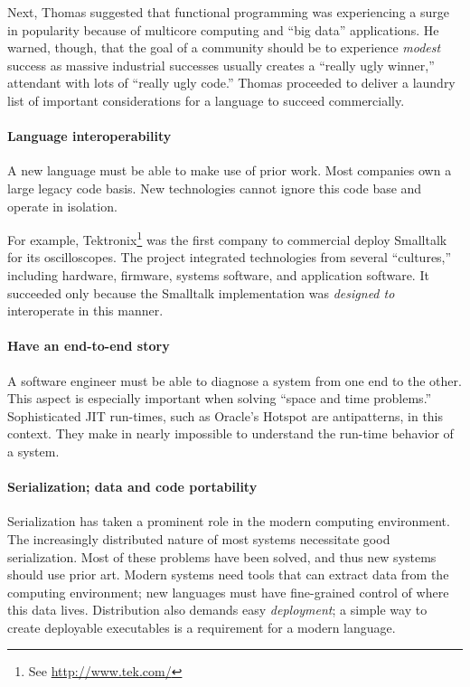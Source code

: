 \documentclass{jfp1}
\begin{document}
Next, Thomas suggested that functional programming was experiencing a surge
in popularity because of multicore computing and ``big data''
applications. He warned, though, that the goal of a community should be to
experience \textit{modest} success as massive industrial successes usually
creates a ``really ugly winner,'' attendant with lots of ``really ugly
code.'' Thomas proceeded to deliver a laundry list of important
considerations for a language to succeed commercially.

\paragraph{Language interoperability} A new language must be able to make
use of prior work. Most companies own a large legacy code basis. New
technologies cannot ignore this code base and operate in isolation.  

For example, Tektronix\footnote{See \url{http://www.tek.com/}} was the
first company to commercial deploy Smalltalk for its oscilloscopes. The
project integrated technologies from several ``cultures,'' including
hardware, firmware, systems software, and application software. It
succeeded only because the Smalltalk implementation was {\em designed to\/}
interoperate in this manner.

\paragraph{Have an end-to-end story} A software engineer must be able to
diagnose a system from one end to the other. This aspect is especially
important when solving ``space and time problems.'' Sophisticated JIT
run-times, such as Oracle's Hotspot are antipatterns, in this context. They
make in nearly impossible to understand the run-time behavior of a system.

\paragraph{Serialization; data and code portability} Serialization has
taken a prominent role in the modern computing environment. The
increasingly distributed nature of most systems necessitate good
serialization.  Most of these problems have been solved, and thus new
systems should use prior art. Modern systems need tools that can extract
data from the computing environment; new languages must have fine-grained
control of where this data lives. Distribution also demands easy
\textit{deployment}; a simple way to create deployable executables is a
requirement for a modern language.
\end{document}
